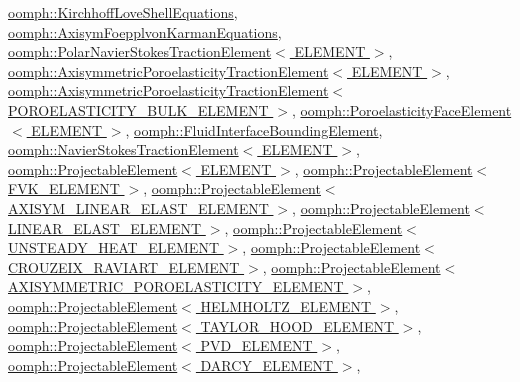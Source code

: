 \hyperlink{classoomph_1_1KirchhoffLoveShellEquations_a98020c975dd08c1faf3ecbe8f127788d}{oomph\+::\+Kirchhoff\+Love\+Shell\+Equations}, \hyperlink{classoomph_1_1AxisymFoepplvonKarmanEquations_a18148b60b9a4addc513f1aed354bd63d}{oomph\+::\+Axisym\+Foepplvon\+Karman\+Equations}, \hyperlink{classoomph_1_1PolarNavierStokesTractionElement_adedf328068563b40bf9b2a0cafcfe087}{oomph\+::\+Polar\+Navier\+Stokes\+Traction\+Element$<$ E\+L\+E\+M\+E\+N\+T $>$}, \hyperlink{classoomph_1_1AxisymmetricPoroelasticityTractionElement_a0db1a4eba81137b3740fcbd7bc705f48}{oomph\+::\+Axisymmetric\+Poroelasticity\+Traction\+Element$<$ E\+L\+E\+M\+E\+N\+T $>$}, \hyperlink{classoomph_1_1AxisymmetricPoroelasticityTractionElement_a0db1a4eba81137b3740fcbd7bc705f48}{oomph\+::\+Axisymmetric\+Poroelasticity\+Traction\+Element$<$ P\+O\+R\+O\+E\+L\+A\+S\+T\+I\+C\+I\+T\+Y\+\_\+\+B\+U\+L\+K\+\_\+\+E\+L\+E\+M\+E\+N\+T $>$}, \hyperlink{classoomph_1_1PoroelasticityFaceElement_a4396aa8d950dca2c1eba4bfb9e8d608c}{oomph\+::\+Poroelasticity\+Face\+Element$<$ E\+L\+E\+M\+E\+N\+T $>$}, \hyperlink{classoomph_1_1FluidInterfaceBoundingElement_acaa709e7a402418fb03f2bf0f57f53ea}{oomph\+::\+Fluid\+Interface\+Bounding\+Element}, \hyperlink{classoomph_1_1NavierStokesTractionElement_a049940e46f7aba913cf05f95c31061f3}{oomph\+::\+Navier\+Stokes\+Traction\+Element$<$ E\+L\+E\+M\+E\+N\+T $>$}, \hyperlink{classoomph_1_1ProjectableElement_aeb0de899b7a5c7f498b2206ab00ef786}{oomph\+::\+Projectable\+Element$<$ E\+L\+E\+M\+E\+N\+T $>$}, \hyperlink{classoomph_1_1ProjectableElement_aeb0de899b7a5c7f498b2206ab00ef786}{oomph\+::\+Projectable\+Element$<$ F\+V\+K\+\_\+\+E\+L\+E\+M\+E\+N\+T $>$}, \hyperlink{classoomph_1_1ProjectableElement_aeb0de899b7a5c7f498b2206ab00ef786}{oomph\+::\+Projectable\+Element$<$ A\+X\+I\+S\+Y\+M\+\_\+\+L\+I\+N\+E\+A\+R\+\_\+\+E\+L\+A\+S\+T\+\_\+\+E\+L\+E\+M\+E\+N\+T $>$}, \hyperlink{classoomph_1_1ProjectableElement_aeb0de899b7a5c7f498b2206ab00ef786}{oomph\+::\+Projectable\+Element$<$ L\+I\+N\+E\+A\+R\+\_\+\+E\+L\+A\+S\+T\+\_\+\+E\+L\+E\+M\+E\+N\+T $>$}, \hyperlink{classoomph_1_1ProjectableElement_aeb0de899b7a5c7f498b2206ab00ef786}{oomph\+::\+Projectable\+Element$<$ U\+N\+S\+T\+E\+A\+D\+Y\+\_\+\+H\+E\+A\+T\+\_\+\+E\+L\+E\+M\+E\+N\+T $>$}, \hyperlink{classoomph_1_1ProjectableElement_aeb0de899b7a5c7f498b2206ab00ef786}{oomph\+::\+Projectable\+Element$<$ C\+R\+O\+U\+Z\+E\+I\+X\+\_\+\+R\+A\+V\+I\+A\+R\+T\+\_\+\+E\+L\+E\+M\+E\+N\+T $>$}, \hyperlink{classoomph_1_1ProjectableElement_aeb0de899b7a5c7f498b2206ab00ef786}{oomph\+::\+Projectable\+Element$<$ A\+X\+I\+S\+Y\+M\+M\+E\+T\+R\+I\+C\+\_\+\+P\+O\+R\+O\+E\+L\+A\+S\+T\+I\+C\+I\+T\+Y\+\_\+\+E\+L\+E\+M\+E\+N\+T $>$}, \hyperlink{classoomph_1_1ProjectableElement_aeb0de899b7a5c7f498b2206ab00ef786}{oomph\+::\+Projectable\+Element$<$ H\+E\+L\+M\+H\+O\+L\+T\+Z\+\_\+\+E\+L\+E\+M\+E\+N\+T $>$}, \hyperlink{classoomph_1_1ProjectableElement_aeb0de899b7a5c7f498b2206ab00ef786}{oomph\+::\+Projectable\+Element$<$ T\+A\+Y\+L\+O\+R\+\_\+\+H\+O\+O\+D\+\_\+\+E\+L\+E\+M\+E\+N\+T $>$}, \hyperlink{classoomph_1_1ProjectableElement_aeb0de899b7a5c7f498b2206ab00ef786}{oomph\+::\+Projectable\+Element$<$ P\+V\+D\+\_\+\+E\+L\+E\+M\+E\+N\+T $>$}, \hyperlink{classoomph_1_1ProjectableElement_aeb0de899b7a5c7f498b2206ab00ef786}{oomph\+::\+Projectable\+Element$<$ D\+A\+R\+C\+Y\+\_\+\+E\+L\+E\+M\+E\+N\+T $>$}, 